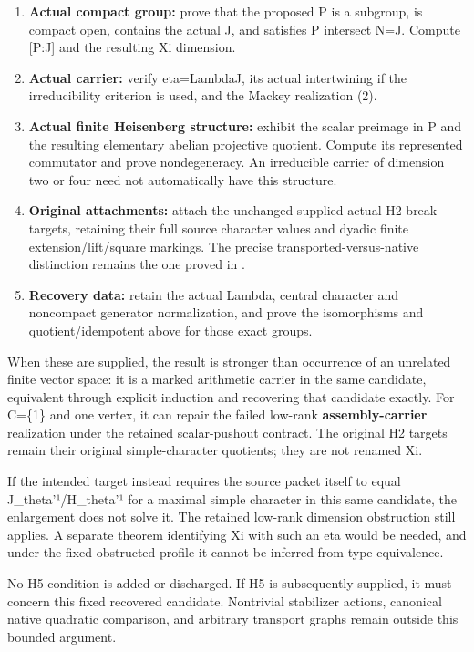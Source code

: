\begin{enumerate}
\def\labelenumi{\arabic{enumi}.}
\tightlist
\item
  \textbf{Actual compact group:} prove that the proposed P is a
  subgroup, is compact open, contains the actual J, and satisfies P
  intersect N=J. Compute {[}P:J{]} and the resulting Xi dimension.
\item
  \textbf{Actual carrier:} verify eta=Lambda\textbar J, its actual
  intertwining if the irreducibility criterion is used, and the Mackey
  realization (2).
\item
  \textbf{Actual finite Heisenberg structure:} exhibit the scalar
  preimage in P and the resulting elementary abelian projective
  quotient. Compute its represented commutator and prove nondegeneracy.
  An irreducible carrier of dimension two or four need not automatically
  have this structure.
\item
  \textbf{Original attachments:} attach the unchanged supplied actual H2
  break targets, retaining their full source character values and dyadic
  finite extension/lift/square markings. The precise
  transported-versus-native distinction remains the one proved in
  .
\item
  \textbf{Recovery data:} retain the actual Lambda, central character
  and noncompact generator normalization, and prove the isomorphisms and
  quotient/idempotent above for those exact groups.
\end{enumerate}

When these are supplied, the result is stronger than occurrence of an
unrelated finite vector space: it is a marked arithmetic carrier in the
same candidate, equivalent through explicit induction and recovering
that candidate exactly. For C=\{1\} and one vertex, it can repair the
failed low-rank \textbf{assembly-carrier} realization under the retained
scalar-pushout contract. The original H2 targets remain their original
simple-character quotients; they are not renamed Xi.

If the intended target instead requires the source packet itself to
equal J\_theta'¹/H\_theta'¹ for a maximal simple character in this same
candidate, the enlargement does not solve it. The retained low-rank
dimension obstruction still applies. A separate theorem identifying Xi
with such an eta would be needed, and under the fixed obstructed profile
it cannot be inferred from type equivalence.

No H5 condition is added or discharged. If H5 is subsequently supplied,
it must concern this fixed recovered candidate. Nontrivial stabilizer
actions, canonical native quadratic comparison, and arbitrary transport
graphs remain outside this bounded argument.

